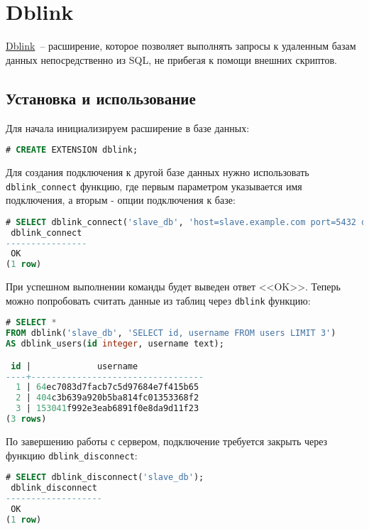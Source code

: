 \section{Dblink}

\href{https://www.postgresql.org/docs/current/static/dblink.html}{Dblink}~-- расширение, которое позволяет выполнять запросы к удаленным базам данных непосредственно из SQL, не прибегая к помощи внешних скриптов.

\subsection{Установка и использование}

Для начала инициализируем расширение в базе данных:

\begin{lstlisting}[language=SQL,label=lst:dblink1,caption=Инициализация dblink]
# CREATE EXTENSION dblink;
\end{lstlisting}

Для создания подключения к другой базе данных нужно использовать \lstinline!dblink_connect! функцию, где первым параметром указывается имя подключения, а вторым - опции подключения к базе:

\begin{lstlisting}[language=SQL,label=lst:dblink2,caption=Подключение через dblink]
# SELECT dblink_connect('slave_db', 'host=slave.example.com port=5432 dbname=exampledb user=admin password=password');
 dblink_connect
----------------
 OK
(1 row)
\end{lstlisting}

При успешном выполнении команды будет выведен ответ <<OK>>. Теперь можно попробовать считать данные из таблиц через \lstinline!dblink! функцию:

\begin{lstlisting}[language=SQL,label=lst:dblink3,caption=SELECT]
# SELECT *
FROM dblink('slave_db', 'SELECT id, username FROM users LIMIT 3')
AS dblink_users(id integer, username text);

 id |             username
----+----------------------------------
  1 | 64ec7083d7facb7c5d97684e7f415b65
  2 | 404c3b639a920b5ba814fc01353368f2
  3 | 153041f992e3eab6891f0e8da9d11f23
(3 rows)
\end{lstlisting}

По завершению работы с сервером, подключение требуется закрыть через функцию \lstinline!dblink_disconnect!:

\begin{lstlisting}[language=SQL,label=lst:dblinkclose1,caption=dblink\_disconnect]
# SELECT dblink_disconnect('slave_db');
 dblink_disconnect
-------------------
 OK
(1 row)
\end{lstlisting}


